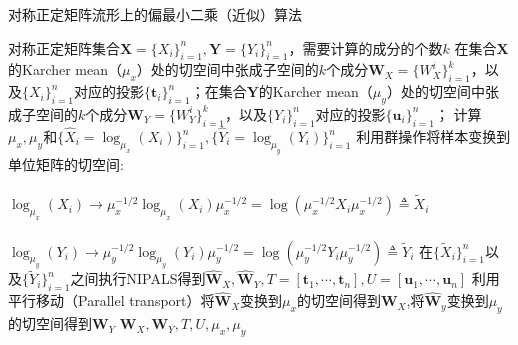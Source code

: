 \begin{algorithm}[htb]
\caption{对称正定矩阵流形上的偏最小二乘（近似）算法}
\label{alg:RPLS_approx}
\begin{algorithmic}[1]
\REQUIRE 对称正定矩阵集合$\bm{X}=\{X_i\}_{i=1}^{n},\bm{Y}=\{Y_i\}_{i=1}^{n}$，需要计算的成分的个数$k$
\ENSURE 在集合$\bm{X}$的Karcher mean（$\mu_x$）处的切空间中张成子空间的$k$个成分$\bm{W}_{X}=\{W_{X}^{i}\}_{i=1}^{k}$，以及$\{X_i\}_{i=1}^{n}$对应的投影$\{\bm{t}_i\}_{i=1}^{n}$；在集合$\bm{Y}$的Karcher mean（$\mu_y$）处的切空间中张成子空间的$k$个成分$\bm{W}_{Y}=\{W_{Y}^{i}\}_{i=1}^{k}$，以及$\{Y_i\}_{i=1}^{n}$对应的投影$\{\bm{u}_i\}_{i=1}^{n}$；
\STATE 计算$\mu_x, \mu_y$和$\{\hat{X}_i=\log_{\mu_{x}}(X_i)\}_{i=1}^{n}, \{\hat{Y}_i=\log_{\mu_{y}}(Y_i)\}_{i=1}^{n}$
\STATE 利用群操作将样本变换到单位矩阵的切空间:\\
~~~~~~~~~~~~~~~~~~~$\log_{\mu_{x}}(X_i)\rightarrow \mu_{x}^{-1/2}\log_{\mu_{x}}(X_i)\mu_{x}^{-1/2}=\log(\mu_{x}^{-1/2}X_i\mu_{x}^{-1/2})\triangleq \tilde{X}_i$\\
~~~~~~~~~~~~~~~~~~~$\log_{\mu_{y}}(Y_i)\rightarrow \mu_{y}^{-1/2}\log_{\mu_{y}}(Y_i)\mu_{y}^{-1/2}=\log(\mu_{y}^{-1/2}Y_i\mu_{y}^{-1/2})\triangleq \tilde{Y}_i$
\STATE 在$\{\tilde{X}_{i}\}_{i=1}^{n}$以及$\{\tilde{Y}_{i}\}_{i=1}^{n}$之间执行NIPALS\cite{pls_NIPALS}得到$\hat{\bm{W}}_X,\hat{\bm{W}}_Y,T=[\bm{t}_1,\cdots,\bm{t}_n],U=[\bm{u}_1,\cdots,\bm{u}_n]$
\STATE 利用平行移动（Parallel transport\cite{RCCA}）将$\hat{\bm{W}}_X$变换到$\mu_x$的切空间得到$\bm{W}_X$,将$\hat{\bm{W}}_y$变换到$\mu_y$的切空间得到$\bm{W}_Y$
\RETURN $\bm{W}_X,\bm{W}_Y,T,U,\mu_x,\mu_y$
\end{algorithmic}
\end{algorithm}

